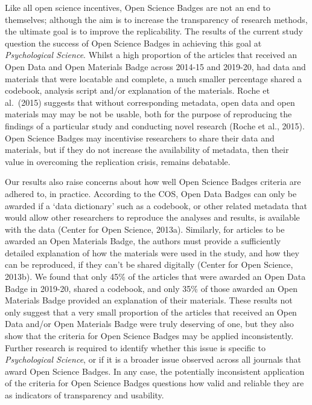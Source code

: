 \documentclass[
  english,
  man,floatsintext]{apa6}
\begin{document}
Like all open science incentives, Open Science Badges are not an end to themselves; although the aim is to increase the transparency of research methods, the ultimate goal is to improve the replicability. The results of the current study question the success of Open Science Badges in achieving this goal at \emph{Psychological Science}. Whilst a high proportion of the articles that received an Open Data and Open Materials Badge across 2014-15 and 2019-20, had data and materials that were locatable and complete, a much smaller percentage shared a codebook, analysis script and/or explanation of the materials. Roche et al.~(2015) suggests that without corresponding metadata, open data and open materials may may be not be usable, both for the purpose of reproducing the findings of a particular study and conducting novel research (Roche et al., 2015). Open Science Badges may incentivise researchers to share their data and materials, but if they do not increase the availability of metadata, then their value in overcoming the replication crisis, remains debatable.

Our results also raise concerns about how well Open Science Badges criteria are adhered to, in practice. According to the COS, Open Data Badges can only be awarded if a `data dictionary' such as a codebook, or other related metadata that would allow other researchers to reproduce the analyses and results, is available with the data (Center for Open Science, 2013a). Similarly, for articles to be awarded an Open Materials Badge, the authors must provide a sufficiently detailed explanation of how the materials were used in the study, and how they can be reproduced, if they can't be shared digitally (Center for Open Science, 2013b). We found that only 45\% of the articles that were awarded an Open Data Badge in 2019-20, shared a codebook, and only 35\% of those awarded an Open Materials Badge provided an explanation of their materials. These results not only suggest that a very small proportion of the articles that received an Open Data and/or Open Materials Badge were truly deserving of one, but they also show that the criteria for Open Science Badges may be applied inconsistently. Further research is required to identify whether this issue is specific to \emph{Psychological Science}, or if it is a broader issue observed across all journals that award Open Science Badges. In any case, the potentially inconsistent application of the criteria for Open Science Badges questions how valid and reliable they are as indicators of transparency and usability.
\end{document}
